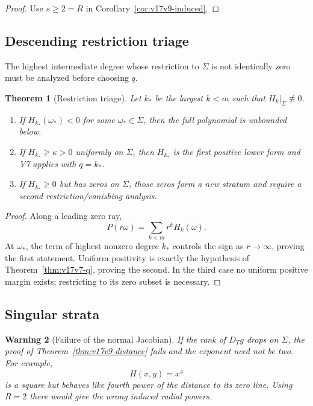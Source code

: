 \documentclass[11pt]{article}
\newtheorem{theorem}{Theorem}[section]
\newtheorem{warning}[theorem]{Warning}
\theoremstyle{remark}
\begin{document}
\begin{proof}
Use \(s\geq2=R\) in Corollary~\ref{cor:v17v9-induced}.
\end{proof}

\subsection{Descending restriction triage}

The highest intermediate degree whose restriction to \(\Sigma\) is
not identically zero must be analyzed before choosing \(q\).

\begin{theorem}[Restriction triage]
\label{thm:v17v9-triage}
Let \(k_*\) be the largest \(k<m\) such that
\(H_k|_\Sigma\not\equiv0\).
\begin{enumerate}
\item If \(H_{k_*}(\omega_*)<0\) for some
      \(\omega_*\in\Sigma\), then the full polynomial is unbounded
      below.
\item If \(H_{k_*}\geq\kappa>0\) uniformly on \(\Sigma\), then
      \(H_{k_*}\) is the first positive lower form and V7 applies
      with \(q=k_*\).
\item If \(H_{k_*}\geq0\) but has zeros on \(\Sigma\), those zeros
      form a new stratum and require a second restriction/vanishing
      analysis.
\end{enumerate}
\end{theorem}

\begin{proof}
Along a leading zero ray,
\[
 P(r\omega)
 =
 \sum_{k<m}r^kH_k(\omega).                          \tag{9.17}
\]
At \(\omega_*\), the term of highest nonzero degree \(k_*\) controls
the sign as \(r\to\infty\), proving the first statement.  Uniform
positivity is exactly the hypothesis of
Theorem~\ref{thm:v17v7-q}, proving the second.  In the third case no
uniform positive margin exists; restricting to its zero subset is
necessary.
\end{proof}

\subsection{Singular strata}

\begin{warning}[Failure of the normal Jacobian]
\label{warn:v17v9-singular}
If the rank of \(D_Tg\) drops on \(\Sigma\), the proof of
Theorem~\ref{thm:v17v9-distance} fails and the exponent need not be
two.  For example,
\[
 H(x,y)=x^4                                         \tag{9.18}
\]
is a square but behaves like fourth power of the distance to its
zero line.  Using \(R=2\) there would give the wrong induced radial
powers.
\end{warning}
\end{document}
